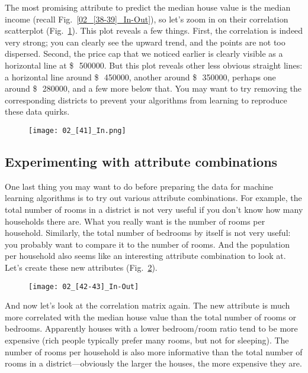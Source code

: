 The most promising attribute to predict the median house value is the median income (recall Fig.~\ref{02_[38-39]_In-Out}), so let's zoom in on their correlation scatterplot (Fig.~\ref{02_[41]_In}). This plot reveals a few things. First, the correlation is indeed very strong; you can clearly see the upward trend, and the points are not too dispersed. Second, the price cap that we noticed earlier is clearly visible as a horizontal line at \SI{500000}[\$\,]{}. But this plot reveals other less obvious straight lines: a horizontal line around \SI{450000}[\$\,]{}, another around \SI{350000}[\$\,]{}, perhaps one around \SI{280000}[\$\,]{}, and a few more below that. You may want to try removing the corresponding districts to prevent your algorithms from learning to reproduce these data quirks.
\begin{figure}[h!t]
\centering
\texttt{[image: 02\_[41]\_In.png]}
\caption{}\label{02_[41]_In}
\end{figure}
\subsection{Experimenting with attribute combinations}
One last thing you may want to do before preparing the data for machine learning algorithms is to try out various attribute combinations. For example, the total number of rooms in a district is not very useful if you don't know how many households there are. What you really want is the number of rooms per household. Similarly, the total number of bedrooms by itself is not very useful: you probably want to compare it to the number of rooms. And the population per household also seems like an interesting attribute combination to look at. Let's create these new attributes (Fig.~\ref{02_[42-43]_In-Out}).
\begin{figure}[h!t]
\centering
\texttt{[image: 02\_[42-43]\_In-Out]}
\caption{}\label{02_[42-43]_In-Out}
\end{figure}

And now let's look at the correlation matrix again. The new  attribute is much more correlated with the median house value than the total number of rooms or bedrooms. Apparently houses with a lower bedroom/room ratio tend to be more expensive (rich people typically prefer many rooms, but not for sleeping). The number of rooms per household is also more informative than the total number of rooms in a district—obviously the larger the houses, the more expensive they are.
